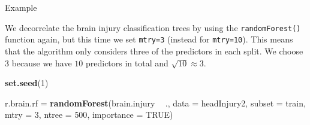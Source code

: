 \documentclass[10pt,ignorenonframetext,]{beamer}
\newenvironment{Shaded}{\begin{snugshade}}{\end{snugshade}}
\newcommand{\KeywordTok}[1]{\textcolor[rgb]{0.13,0.29,0.53}{\textbf{#1}}}
\newcommand{\DataTypeTok}[1]{\textcolor[rgb]{0.13,0.29,0.53}{#1}}
\newcommand{\DecValTok}[1]{\textcolor[rgb]{0.00,0.00,0.81}{#1}}
\newcommand{\StringTok}[1]{\textcolor[rgb]{0.31,0.60,0.02}{#1}}
\newcommand{\OtherTok}[1]{\textcolor[rgb]{0.56,0.35,0.01}{#1}}
\newcommand{\OperatorTok}[1]{\textcolor[rgb]{0.81,0.36,0.00}{\textbf{#1}}}
\newcommand{\NormalTok}[1]{#1}
\begin{document}
\begin{frame}[fragile]

\begin{block}{Example}

\vspace{2mm}

We decorrelate the brain injury classification trees by using the
\texttt{randomForest()} function again, but this time we set
\texttt{mtry=3} (instead for \texttt{mtry=10}). This means that the
algorithm only considers three of the predictors in each split. We
choose \(3\) because we have \(10\) predictors in total and
\(\sqrt{10}\approx 3\).

\scriptsize

\begin{Shaded}
\begin{Highlighting}[]
\KeywordTok{set.seed}\NormalTok{(}\DecValTok{1}\NormalTok{)}

\NormalTok{r.brain.rf =}\StringTok{ }\KeywordTok{randomForest}\NormalTok{(brain.injury }\OperatorTok{~}\StringTok{ }\NormalTok{., }\DataTypeTok{data =}\NormalTok{ headInjury2, }\DataTypeTok{subset =}\NormalTok{ train, }
    \DataTypeTok{mtry =} \DecValTok{3}\NormalTok{, }\DataTypeTok{ntree =} \DecValTok{500}\NormalTok{, }\DataTypeTok{importance =} \OtherTok{TRUE}\NormalTok{)}
\end{Highlighting}
\end{Shaded}

\end{block}

\end{frame}
\end{document}
